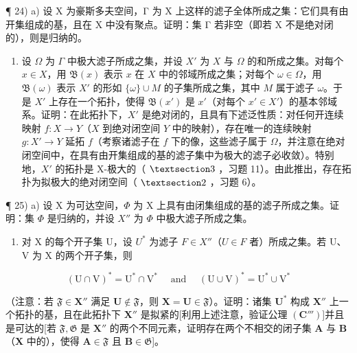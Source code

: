 ¶ 24) a) 设 X 为豪斯多夫空间，Γ 为 X 上这样的滤子全体所成之集：它们具有由开集组成的基，且在 X 中没有聚点。证明：集 Γ 若非空（即若 X 不是绝对闭的），则是归纳的。

\begin{enumerate}
\def\labelenumi{\alph{enumi})}
\setcounter{enumi}{1}
\tightlist
\item
  设 \(\Omega\) 为 \(\Gamma\) 中极大滤子所成之集，并设 \(X'\) 为 \(X\) 与 \(\Omega\) 的和所成之集。对每个 \(x \in X\)，用 \(\mathfrak{B}(x)\) 表示 \(x\) 在 \(X\) 中的邻域所成之集；对每个 \(\omega \in \Omega\)，用 \(\mathfrak{B}(\omega)\) 表示 \(X'\) 的形如 \(\{\omega\} \cup M\) 的子集所成之集，其中 \(M\) 属于滤子 \(\omega\)。于是 \(X'\) 上存在一个拓扑，使得 \(\mathfrak{B}(x')\) 是 \(x'\)（对每个 \(x' \in X'\)）的基本邻域系。证明：在此拓扑下，\(X'\) 是绝对闭的，且具有下述泛性质：对任何开连续映射 \(f: X \to Y\)（\(X\) 到绝对闭空间 \(Y\) 中的映射），存在唯一的连续映射 \(g: X' \to Y\) 延拓 \(f\)（考察诸滤子在 \(f\) 下的像，这些滤子属于 \(\Omega\)，并注意在绝对闭空间中，在具有由开集组成的基的滤子集中为极大的滤子必收敛）。特别地，\(X'\) 的拓扑是 X-极大的（ \(\S 3\) ，习题 11）。由此推出，存在拓扑为拟极大的绝对闭空间（ \(\S 2\) ，习题 6）。
\end{enumerate}

¶ 25) a) 设 X 为可达空间，\(\Phi\) 为 X 上具有由闭集组成的基的滤子所成之集。证明：集 \(\Phi\) 是归纳的，并设 \(X''\) 为 \(\Phi\) 中极大滤子所成之集。

\begin{enumerate}
\def\labelenumi{\alph{enumi})}
\setcounter{enumi}{1}
\tightlist
\item
  对 X 的每个开子集 U，设 \(U^{*}\) 为滤子 \(F \in X''\)（\(U \in F\) 者）所成之集。若 U、V 为 X 的两个开子集，则
\end{enumerate}

\[
(\mathrm{U} \cap \mathrm{V}) ^ {*} = \mathrm{U} ^ {*} \cap \mathrm{V} ^ {*} \quad \text { and } \quad (\mathrm{U} \cup \mathrm{V}) ^ {*} = \mathrm{U} ^ {*} \cup \mathrm{V} ^ {*}
\]

（注意：若 \(\mathfrak{F} \in \mathbf{X}''\) 满足 \(\mathbf{U} \notin \mathfrak{F}\)，则 \(\mathbf{X} = \mathbf{U} \in \mathfrak{F}\)）。证明：诸集 \(\mathbf{U}^*\) 构成 \(\mathbf{X}''\) 上一个拓扑的基，且在此拓扑下 \(\mathbf{X}''\) 是拟紧的{[}利用上述注意，验证公理 \((\mathbf{C}''')\){]}并且是可达的{[}若 \(\mathfrak{F}, \mathfrak{G}\) 是 \(\mathbf{X}''\) 的两个不同元素，证明存在两个不相交的闭子集 \(\mathbf{A}\) 与 \(\mathbf{B}\)（\(\mathbf{X}\) 中的），使得 \(\mathbf{A} \in \mathfrak{F}\) 且 \(\mathbf{B} \in \mathfrak{G}\){]}。

